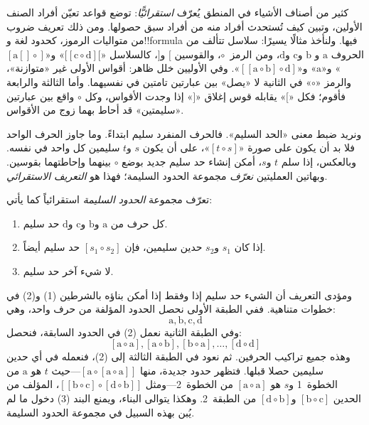 \documentclass[../../../include/open-logic-section]{subfiles}
\begin{document}


كثير من أصناف الأشياء في المنطق يُعرّف \emph{استقرائيًّا}: توضع قواعد
تعيّن أفراد الصنف الأولين، وتبين كيف تُستحدث أفراد منه من أفراد سبق
حصولها. ومن ذلك تعريف ضروب من متواليات الرموز، كحدود لغة و!!{formula}
فيها. ولنأخذ مثالًا يسيرًا: سلاسل تتألف من الحروف $\mathrm{a}$ و
$\mathrm{b}$ و$\mathrm{c}$ و$\mathrm{d}$، ومن الرمز~$\circ$،
والقوسين $[$ و$]$، كالسلاسل
«$[[\mathrm{c} \circ \mathrm{d}][$» و«$[\mathrm{a}[]\circ]$»
و«$\mathrm{a}$» و«$[[\mathrm{a} \circ \mathrm{b}]\circ
\mathrm{d}]$». وفي الأوليين خلل ظاهر: أقواس الأولى غير «متوازنة»،
والرمز «$\circ$» في الثانية لا «يصل» بين عبارتين تامتين في نفسيهما.
وأما الثالثة والرابعة فأقوم؛ فكل «$[$» يقابله قوس إغلاق «$]$» إذا
وجدت الأقواس، وكل $\circ$ واقع بين عبارتين «سليمتين» قد أحاط بهما زوج
من الأقواس.

ونريد ضبط معنى «الحد السليم». فالحرف المنفرد سليم ابتداءً. وما جاوز
الحرف الواحد فلا بد أن يكون على صورة «$[t \circ s]$»، على أن يكون
$s$ و$t$ سليمين كل واحد في نفسه. وبالعكس، إذا سلم $t$ و$s$، أمكن
إنشاء حد سليم جديد بوضع $\circ$ بينهما وإحاطتهما بقوسين. وبهاتين
العمليتين \emph{نعرّف} مجموعة الحدود السليمة؛ فهذا هو
\emph{التعريف الاستقرائي}.

\begin{defn}
  تعرّف مجموعة \emph{الحدود السليمة} استقرائياً كما يأتي:
  \begin{enumerate}
  \item كل حرف من $\mathrm{a}$ و$\mathrm{b}$ و$\mathrm{c}$
    و$\mathrm{d}$ حد سليم.
  \item إذا كان $s_1$ و$s_2$ حدين سليمين، فإن
    $[s_1 \circ s_2]$ حد سليم أيضاً.
  \item لا شيء آخر حد سليم.
  \end{enumerate}
\end{defn}

ومؤدى التعريف أن الشيء حد سليم إذا وفقط إذا أمكن بناؤه بالشرطين (1)
و(2) في خطوات متناهية. ففي الطبقة الأولى نحصل الحدود المؤلفة من حرف
واحد، وهي:
\[
\mathrm{a}, \mathrm{b}, \mathrm{c}, \mathrm{d}
\]
وفي الطبقة الثانية نعمل (2) في الحدود السابقة، فنحصل:
\[
[\mathrm{a} \circ \mathrm{a}], [\mathrm{a} \circ \mathrm{b}],
[\mathrm{b} \circ \mathrm{a}], \dots, [\mathrm{d} \circ \mathrm{d}]
\]
وهذه جميع تراكيب الحرفين. ثم نعود في الطبقة الثالثة إلى (2)، فنعمله
في أي حدين سليمين حصلا قبلها. فتظهر حدود جديدة، منها
$[\mathrm{a} \circ [\mathrm{a} \circ \mathrm{a}]]$---حيث $t$ هو
$\mathrm{a}$ من الخطوة~1 و$s$ هو
$[\mathrm{a} \circ \mathrm{a}]$ من الخطوة~2---ومثل
$[[\mathrm{b} \circ \mathrm{c}] \circ [\mathrm{d} \circ
\mathrm{b}]]$، المؤلف من الحدين $[\mathrm{b} \circ \mathrm{c}]$
و$[\mathrm{d} \circ \mathrm{b}]$ من الطبقة~2. وهكذا يتوالى البناء،
ويمنع البند (3) دخول ما لم يُبن بهذه السبيل في مجموعة الحدود السليمة.
\end{document}
